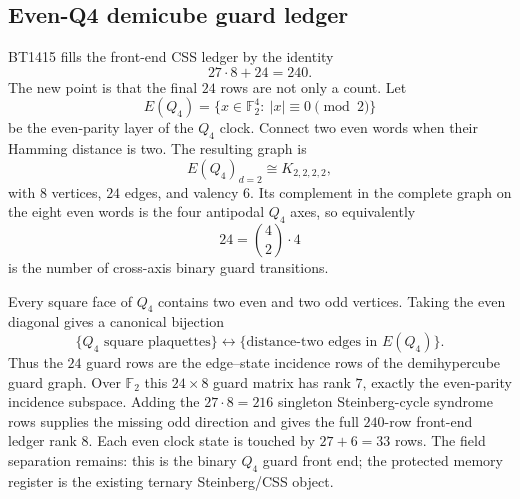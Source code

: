 \subsection{Even-Q4 demicube guard ledger}
\label{sec:bt1416-even-q4-guard}

BT1415 fills the front-end CSS ledger by the identity
\[
27\cdot 8+24=240.
\]
The new point is that the final \(24\) rows are not only a count.  Let
\[
E(Q_4)=\{x\in\mathbb F_2^4:\ |x|\equiv0\pmod2\}
\]
be the even-parity layer of the \(Q_4\) clock.  Connect two even words when
their Hamming distance is two.  The resulting graph is
\[
\boxed{E(Q_4)_{d=2}\cong K_{2,2,2,2}},
\]
with \(8\) vertices, \(24\) edges, and valency \(6\).  Its complement in the
complete graph on the eight even words is the four antipodal \(Q_4\) axes, so
equivalently
\[
24=\binom42\cdot4
\]
is the number of cross-axis binary guard transitions.

Every square face of \(Q_4\) contains two even and two odd vertices.  Taking the
even diagonal gives a canonical bijection
\[
\{\text{\(Q_4\) square plaquettes}\}
\longleftrightarrow
\{\text{distance-two edges in }E(Q_4)\}.
\]
Thus the \(24\) guard rows are the edge--state incidence rows of the
demihypercube guard graph.  Over \(\mathbb F_2\) this \(24\times8\) guard
matrix has rank \(7\), exactly the even-parity incidence subspace.  Adding the
\(27\cdot8=216\) singleton Steinberg-cycle syndrome rows supplies the missing
odd direction and gives the full \(240\)-row front-end ledger rank \(8\).  Each
even clock state is touched by \(27+6=33\) rows.  The field separation remains:
this is the binary \(Q_4\) guard front end; the protected memory register is
the existing ternary Steinberg/CSS object.
